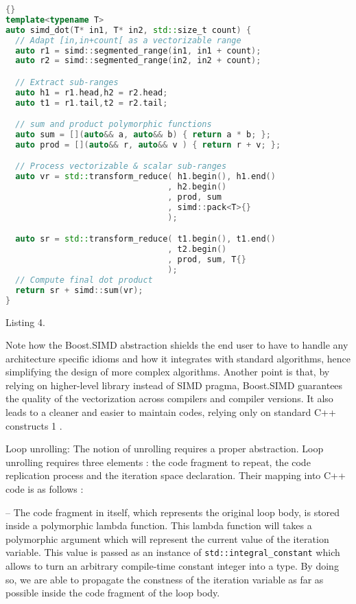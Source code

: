\documentclass[../../main.tex]{subfiles}
\begin{document}
\begin{lstlisting}[language=c++, caption=Sample Boost.SIMD code]{}
template<typename T>
auto simd_dot(T* in1, T* in2, std::size_t count) {
  // Adapt [in,in+count[ as a vectorizable range
  auto r1 = simd::segmented_range(in1, in1 + count);
  auto r2 = simd::segmented_range(in2, in2 + count);

  // Extract sub-ranges
  auto h1 = r1.head,h2 = r2.head;
  auto t1 = r1.tail,t2 = r2.tail;

  // sum and product polymorphic functions
  auto sum = [](auto&& a, auto&& b) { return a * b; };
  auto prod = [](auto&& r, auto&& v ) { return r + v; };

  // Process vectorizable & scalar sub-ranges
  auto vr = std::transform_reduce( h1.begin(), h1.end()
                                 , h2.begin()
                                 , prod, sum
                                 , simd::pack<T>{}
                                 );

  auto sr = std::transform_reduce( t1.begin(), t1.end()
                                 , t2.begin()
                                 , prod, sum, T{}
                                 );
  // Compute final dot product
  return sr + simd::sum(vr);
}
\end{lstlisting}
Listing 4.

Note how the Boost.SIMD abstraction shields the end
user to have to handle any architecture specific idioms
and how it integrates with standard algorithms, hence
simplifying the design of more complex algorithms.
Another point is that, by relying on higher-level library
instead of SIMD pragma, Boost.SIMD guarantees
the quality of the vectorization across compilers and
compiler versions. It also leads to a cleaner and easier to
maintain codes, relying only on standard C++ constructs 1 .

\item Loop unrolling: The notion of unrolling requires
a proper abstraction. Loop unrolling requires three
elements : the code fragment to repeat, the code
replication process and the iteration space declaration.
Their mapping into C++ code is as follows :

– The code fragment in itself, which represents
the original loop body, is stored inside a
polymorphic lambda function. This lambda
function will takes a polymorphic argument which
will represent the current value of the iteration
variable. This value is passed as an instance of
\lstinline{std::integral_constant} which allows to
turn an arbitrary compile-time constant integer into
a type. By doing so, we are able to propagate the
constness of the iteration variable as far as possible
inside the code fragment of the loop body.
\end{document}
